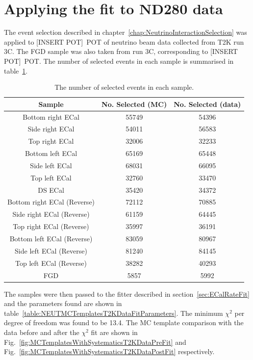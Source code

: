 \section{Applying the fit to ND280 data}
\label{sec:ND280DataFit}
The event selection described in chapter~\ref{chap:NeutrinoInteractionSelection} was applied to [INSERT POT]~POT of neutrino beam data collected from T2K run 3C.  The FGD sample was also taken from run 3C, corresponding to [INSERT POT]~POT.  The number of selected events in each sample is summarised in table~\ref{table:NSelectedEventsMCDataAllSamples}.
\begin{table}
  \begin{tabular}{c c c}
    Sample & No. Selected (MC) & No. Selected (data) \\ \hline \hline
   Bottom right ECal & 55749 & 54396 \\
   Side right ECal & 54011 & 56583 \\
   Top right ECal & 32006 & 32233 \\
   Bottom left ECal & 65169 & 65448 \\
   Side left ECal & 68031 & 66095 \\
   Top left ECal & 32760 & 33470 \\
   DS ECal & 35420 & 34372 \\
   Bottom right ECal (Reverse) & 72112 & 70885 \\
   Side right ECal (Reverse) & 61159 & 64445 \\
   Top right ECal (Reverse) & 35997 & 36191 \\
   Bottom left ECal (Reverse) & 83059 & 80967 \\
   Side left ECal (Reverse) & 81240 & 84145 \\
   Top left ECal (Reverse) & 38282 & 40293 \\
   FGD & 5857 & 5992 \\
  \end{tabular}
  \caption{The number of selected events in each sample.}
  \label{table:NSelectedEventsMCDataAllSamples}
\end{table}
\newline
\newline
The samples were then passed to the fitter described in section~\ref{sec:ECalRateFit} and the parameters found are shown in table~\ref{table:NEUTMCTemplatesT2KDataFitParameters}.  The minimum $\chi^2$ per degree of freedom was found to be 13.4.  The MC template comparison with the data before and after the $\chi^2$ fit are shown in Fig.~\ref{fig:MCTemplatesWithSystematicsT2KDataPreFit} and Fig.~\ref{fig:MCTemplatesWithSystematicsT2KDataPostFit} respectively.
